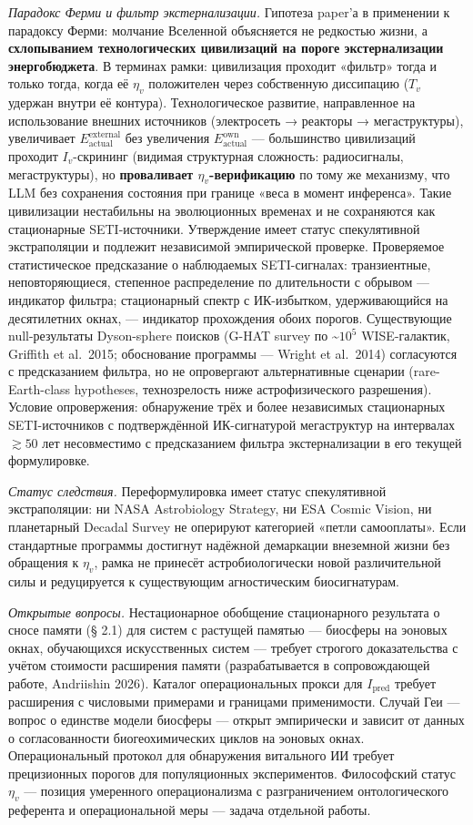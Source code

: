 \documentclass[pdflatex,sn-mathphys-ay]{sn-jnl}
\begin{document}
\emph{Парадокс Ферми и фильтр экстернализации.} Гипотеза paper'а в применении к парадоксу Ферми: молчание Вселенной объясняется не редкостью жизни, а \textbf{схлопыванием технологических цивилизаций на пороге экстернализации энергобюджета}. В терминах рамки: цивилизация проходит «фильтр» тогда и только тогда, когда её \(\eta_v\) положителен через собственную диссипацию (\(T_v\) удержан внутри её контура). Технологическое развитие, направленное на использование внешних источников (электросеть → реакторы → мегаструктуры), увеличивает \(E_{\text{actual}}^{\text{external}}\) без увеличения \(E_{\text{actual}}^{\text{own}}\) --- большинство цивилизаций проходит \(I_v\)-скрининг (видимая структурная сложность: радиосигналы, мегаструктуры), но \textbf{проваливает \(\eta_v\)-верификацию} по тому же механизму, что LLM без сохранения состояния при границе «веса в момент инференса». Такие цивилизации нестабильны на эволюционных временах и не сохраняются как стационарные SETI-источники. Утверждение имеет статус спекулятивной экстраполяции и подлежит независимой эмпирической проверке. Проверяемое статистическое предсказание о наблюдаемых SETI-сигналах: транзиентные, неповторяющиеся, степенное распределение по длительности с обрывом --- индикатор фильтра; стационарный спектр с ИК-избытком, удерживающийся на десятилетних окнах, --- индикатор прохождения обоих порогов. Существующие null-результаты Dyson-sphere поисков (G-HAT survey по \textasciitilde{}\(10^5\) WISE-галактик, Griffith et al.~2015; обоснование программы --- Wright et al.~2014) согласуются с предсказанием фильтра, но не опровергают альтернативные сценарии (rare-Earth-class hypotheses, технозрелость ниже астрофизического разрешения). Условие опровержения: обнаружение трёх и более независимых стационарных SETI-источников с подтверждённой ИК-сигнатурой мегаструктур на интервалах \(\gtrsim 50\) лет несовместимо с предсказанием фильтра экстернализации в его текущей формулировке.

\emph{Статус следствия.} Переформулировка имеет статус спекулятивной экстраполяции: ни NASA Astrobiology Strategy, ни ESA Cosmic Vision, ни планетарный Decadal Survey не оперируют категорией «петли самооплаты». Если стандартные программы достигнут надёжной демаркации внеземной жизни без обращения к \(\eta_v\), рамка не принесёт астробиологически новой различительной силы и редуцируется к существующим агностическим биосигнатурам.

\emph{Открытые вопросы.} Нестационарное обобщение стационарного результата о сносе памяти (§ 2.1) для систем с растущей памятью --- биосферы на эоновых окнах, обучающихся искусственных систем --- требует строгого доказательства с учётом стоимости расширения памяти (разрабатывается в сопровождающей работе, Andriishin 2026). Каталог операциональных прокси для \(I_{\text{pred}}\) требует расширения с числовыми примерами и границами применимости. Случай Геи --- вопрос о единстве модели биосферы --- открыт эмпирически и зависит от данных о согласованности биогеохимических циклов на эоновых окнах. Операциональный протокол для обнаружения витального ИИ требует прецизионных порогов для популяционных экспериментов. Философский статус \(\eta_v\) --- позиция умеренного операционализма с разграничением онтологического референта и операциональной меры --- задача отдельной работы.
\end{document}
